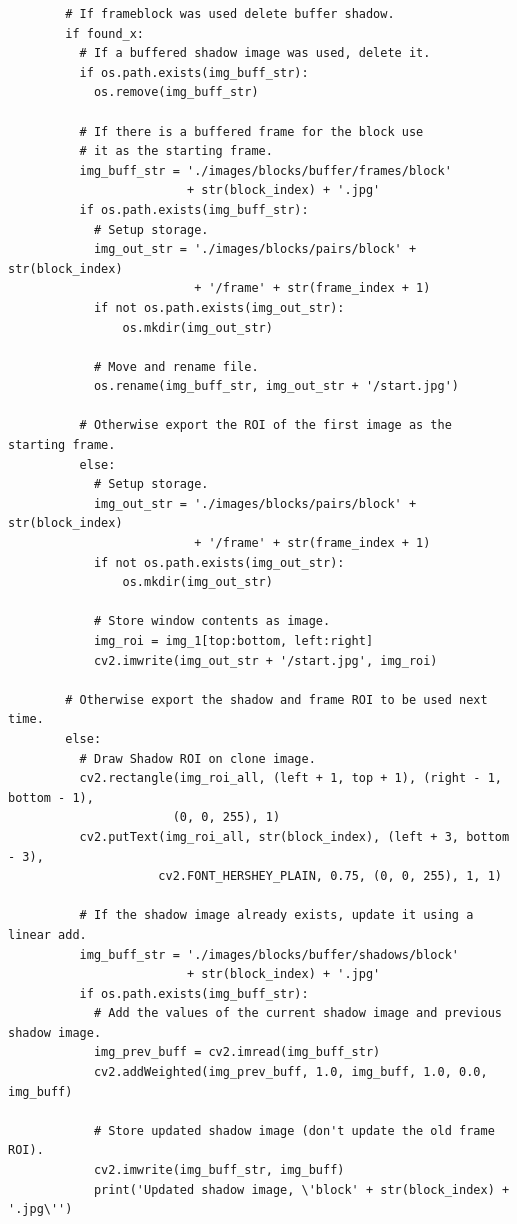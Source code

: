 \documentclass[conference]{IEEEtran}
\begin{document}
\begin{verbatim}
        # If frameblock was used delete buffer shadow.
        if found_x:
          # If a buffered shadow image was used, delete it.
          if os.path.exists(img_buff_str):
            os.remove(img_buff_str)

          # If there is a buffered frame for the block use
          # it as the starting frame.
          img_buff_str = './images/blocks/buffer/frames/block'
                         + str(block_index) + '.jpg'
          if os.path.exists(img_buff_str):
            # Setup storage.
            img_out_str = './images/blocks/pairs/block' + str(block_index)
                          + '/frame' + str(frame_index + 1)
            if not os.path.exists(img_out_str):
                os.mkdir(img_out_str)

            # Move and rename file.
            os.rename(img_buff_str, img_out_str + '/start.jpg')

          # Otherwise export the ROI of the first image as the starting frame.
          else:
            # Setup storage.
            img_out_str = './images/blocks/pairs/block' + str(block_index)
                          + '/frame' + str(frame_index + 1)
            if not os.path.exists(img_out_str):
                os.mkdir(img_out_str)

            # Store window contents as image.
            img_roi = img_1[top:bottom, left:right]
            cv2.imwrite(img_out_str + '/start.jpg', img_roi)

        # Otherwise export the shadow and frame ROI to be used next time.
        else:
          # Draw Shadow ROI on clone image.
          cv2.rectangle(img_roi_all, (left + 1, top + 1), (right - 1, bottom - 1),
                       (0, 0, 255), 1)
          cv2.putText(img_roi_all, str(block_index), (left + 3, bottom - 3),
                     cv2.FONT_HERSHEY_PLAIN, 0.75, (0, 0, 255), 1, 1)

          # If the shadow image already exists, update it using a linear add.
          img_buff_str = './images/blocks/buffer/shadows/block'
                         + str(block_index) + '.jpg'
          if os.path.exists(img_buff_str):
            # Add the values of the current shadow image and previous shadow image.
            img_prev_buff = cv2.imread(img_buff_str)
            cv2.addWeighted(img_prev_buff, 1.0, img_buff, 1.0, 0.0, img_buff)

            # Store updated shadow image (don't update the old frame ROI).
            cv2.imwrite(img_buff_str, img_buff)
            print('Updated shadow image, \'block' + str(block_index) + '.jpg\'')


\end{verbatim}
\end{document}
